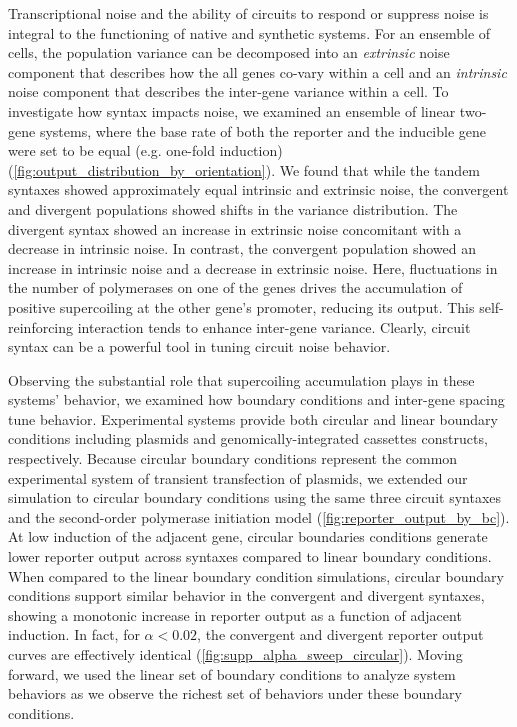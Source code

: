 \documentclass[11pt]{article}
\begin{document}
Transcriptional noise and the ability of circuits to respond or suppress noise is integral to the functioning of native and synthetic systems. For an ensemble of cells, the population variance can be decomposed into an \emph{extrinsic} noise component that describes how the all genes co-vary within a cell and an \emph{intrinsic} noise component that describes the inter-gene variance within a cell. To investigate how syntax impacts noise, we examined an ensemble of linear two-gene systems, where the base rate of both the reporter and the inducible gene were set to be equal (e.g. one-fold induction) (\cref{fig:output_distribution_by_orientation}). We found that while the tandem syntaxes showed approximately equal intrinsic and extrinsic noise, the convergent and divergent populations showed shifts in the variance distribution.
The divergent syntax showed an increase in extrinsic noise concomitant with a decrease in intrinsic noise.
In contrast, the convergent population showed an increase in intrinsic noise and a decrease in extrinsic noise. Here, fluctuations in the number of polymerases on one of the genes drives the accumulation of positive supercoiling at the other gene's promoter, reducing its output. This self-reinforcing interaction tends to enhance inter-gene variance. Clearly, circuit syntax can be a powerful tool in tuning circuit noise behavior.


Observing the substantial role that supercoiling accumulation plays in these systems' behavior, we examined how boundary conditions and inter-gene spacing tune behavior. Experimental systems provide both  circular and linear boundary conditions including  plasmids and genomically-integrated cassettes constructs, respectively. Because circular boundary conditions represent the common experimental system of transient transfection of plasmids, we extended our simulation to circular boundary conditions using the same three circuit syntaxes and the second-order polymerase initiation model (\cref{fig:reporter_output_by_bc}). At low induction of the adjacent gene, circular boundaries conditions generate lower reporter output across syntaxes compared to linear boundary conditions. When compared to the linear boundary condition simulations,  circular boundary conditions support similar behavior in the convergent and divergent syntaxes, showing a monotonic increase in reporter output as a function of adjacent induction. In fact, for \(\alpha < 0.02\), the convergent and divergent reporter output curves are effectively identical (\cref{fig:supp_alpha_sweep_circular}). 
Moving forward, we used the linear set of boundary conditions to analyze system behaviors as we observe the richest set of behaviors under these boundary conditions.
\end{document}

